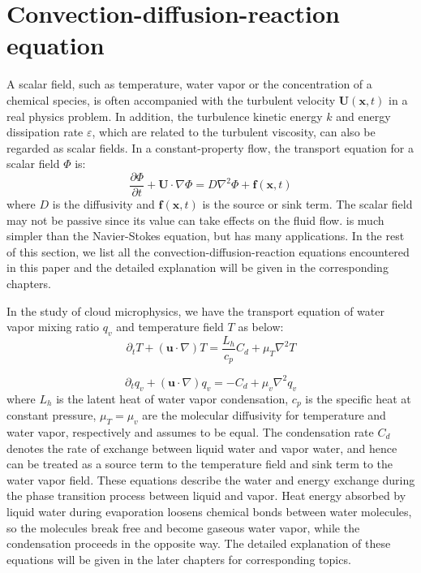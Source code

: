 \section{Convection-diffusion-reaction equation}
A scalar field, such as temperature, water vapor or the concentration of a chemical species, is often accompanied with the turbulent velocity $\mathbf{U}(\mathbf{x},t)$ in a real physics problem. In addition, the turbulence kinetic energy $k$ and energy dissipation rate $\varepsilon$, which are related to the turbulent viscosity, can also be regarded as scalar fields. In a constant-property flow, the transport equation for a scalar field $\Phi$ is:
\begin{equation}
\frac{\partial\Phi}{\partial t} + \mathbf{U}\cdot\nabla\Phi = D\nabla^2\Phi + \mathbf{f}(\mathbf{x},t)
\label{scal_eqn}
\end{equation}
where $D$ is the diffusivity and $\mathbf{f}(\mathbf{x},t)$ is the source or sink term. The scalar field may not be passive since its value can take effects on the fluid flow.  is much simpler than the Navier-Stokes equation, but has many applications.
In the rest of this section, we list all the convection-diffusion-reaction equations encountered in this paper and the detailed explanation will be given in the corresponding chapters.

In the study of cloud microphysics, we have the transport equation of water vapor mixing ratio $q_v$ and temperature field $T$ as below:
\begin{equation}
\partial_{t}T+(\mathbf{u}\cdot\nabla)T=\frac{L_{h}}{c_{p}}C_{d}+\mu_{T}\nabla^{2}T\label{eq:temp_eqn}
\end{equation}

\begin{equation}
\partial_{t}q_{v}+(\mathbf{u}\cdot\nabla)q_{v}=-C_{d}+\mu_{v}\nabla^{2}q_{v}\label{eq:vap_eqn}
\end{equation}
where $L_{h}$ is the latent heat of water vapor condensation, $c_{p}$ is the specific heat at constant pressure, $\mu_{T}=\mu_{v}$ are the molecular diffusivity for temperature and water vapor, respectively and assumes to be equal. The condensation rate $C_{d}$ denotes the rate of exchange between liquid water and vapor water, and hence can be treated as a source term to the temperature field and sink term to the water vapor field. These equations describe the water and energy exchange during the phase transition process between liquid and vapor. Heat energy absorbed by liquid water during evaporation loosens chemical bonds between water molecules, so the molecules break free and become gaseous water vapor, while the condensation proceeds in the opposite way. The detailed explanation of these equations will be given in the later chapters for corresponding topics.

